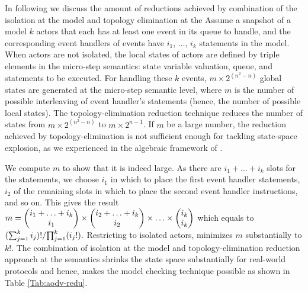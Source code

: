 In following we discuss the amount of reductions achieved by combination of the isolation at the model
 and topology elimination at the  
Assume a snapshot of a model 
$k$ actors that each has at least one event in its queue to handle, and the corresponding event handlers of events have $i_1$, $\ldots$, $i_k$ statements in the model. 
When actors are not isolated, the local states of actors are defined by triple elements in the micro-step semantics: state variable valuation, queue, and statements to be executed.
For handling these $k$ events, $m\times 2^{(n^2-n)}$ global states are generated at the micro-step semantic level, where $m$ is the number of possible interleaving of event handler's statements (hence, the number of possible local states). The topology-elimination reduction technique reduces the number of states from $m\times 2^{(n^2-n)}$ to $m\times2^{n-1}$. If $m$ be a large number, the reduction achieved by topology-elimination is not sufficient enough for tackling state-space explosion, as we experienced in the algebraic framework of \cite{FOAC}.  

We compute $m$ to show that it is indeed large. As there are $i_1+\ldots+i_k$ slots for the statements, we choose $i_1$ in which to place the first event handler statements, $i_2$ of the remaining slots in which to place the second event handler instructions, and so on. This gives the result  ${\small m=\begin{pmatrix}
	i_1+\ldots+i_k\\
	i_1 \\
	\end{pmatrix}\times
	\begin{pmatrix}
	i_2+\ldots+i_k\\
	i_2 \\
	\end{pmatrix}\times	\ldots\times
	\begin{pmatrix}
	i_k\\
	i_k \\
	\end{pmatrix}}$ which equals to ${\small %
{(\sum_{j=1}^{k} i_j)!}/{\prod_{j=1}^{k}(i_j!)}.}$ 
Restricting to isolated actors, minimizes $m$ substantially to $k!$. The combination of isolation at the model and topology-elimination reduction approach at the semantics shrinks the state space substantially for real-world protocols and hence, makes the model checking technique possible as shown in Table \ref{Tab:aodv-redu}. 

